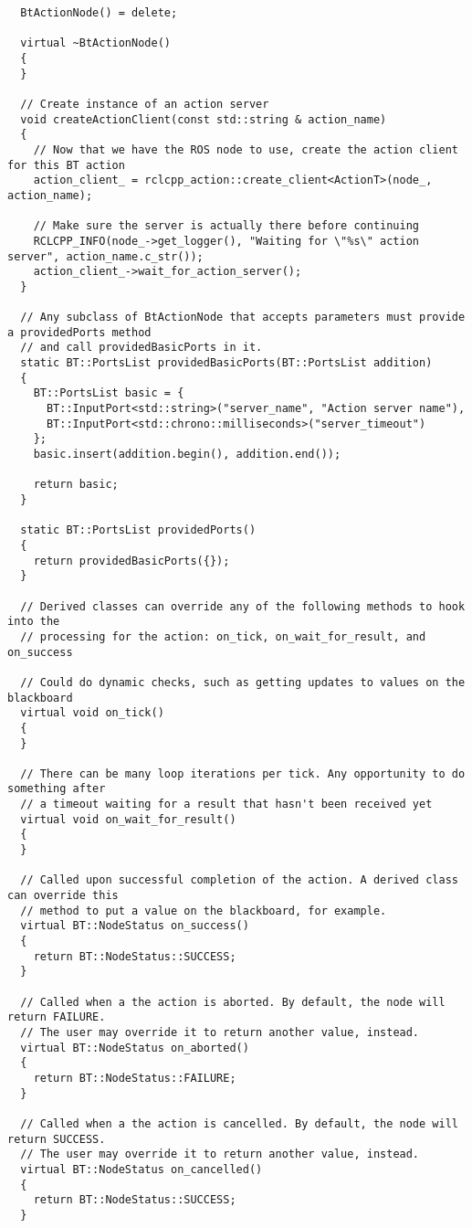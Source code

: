\begin{tcolorbox}[sharp corners, colframe=gray!80, colback=LightGray, left=0pt, top=0pt, bottom=0pt, title=\texttt{br2\_bt\_patrolling/include/br2\_bt\_patrolling/ctrl\_support/BTActionNode.hpp}]
\begin{verbatim}
  BtActionNode() = delete;

  virtual ~BtActionNode()
  {
  }

  // Create instance of an action server
  void createActionClient(const std::string & action_name)
  {
    // Now that we have the ROS node to use, create the action client for this BT action
    action_client_ = rclcpp_action::create_client<ActionT>(node_, action_name);

    // Make sure the server is actually there before continuing
    RCLCPP_INFO(node_->get_logger(), "Waiting for \"%s\" action server", action_name.c_str());
    action_client_->wait_for_action_server();
  }

  // Any subclass of BtActionNode that accepts parameters must provide a providedPorts method
  // and call providedBasicPorts in it.
  static BT::PortsList providedBasicPorts(BT::PortsList addition)
  {
    BT::PortsList basic = {
      BT::InputPort<std::string>("server_name", "Action server name"),
      BT::InputPort<std::chrono::milliseconds>("server_timeout")
    };
    basic.insert(addition.begin(), addition.end());

    return basic;
  }

  static BT::PortsList providedPorts()
  {
    return providedBasicPorts({});
  }

  // Derived classes can override any of the following methods to hook into the
  // processing for the action: on_tick, on_wait_for_result, and on_success

  // Could do dynamic checks, such as getting updates to values on the blackboard
  virtual void on_tick()
  {
  }

  // There can be many loop iterations per tick. Any opportunity to do something after
  // a timeout waiting for a result that hasn't been received yet
  virtual void on_wait_for_result()
  {
  }

  // Called upon successful completion of the action. A derived class can override this
  // method to put a value on the blackboard, for example.
  virtual BT::NodeStatus on_success()
  {
    return BT::NodeStatus::SUCCESS;
  }

  // Called when a the action is aborted. By default, the node will return FAILURE.
  // The user may override it to return another value, instead.
  virtual BT::NodeStatus on_aborted()
  {
    return BT::NodeStatus::FAILURE;
  }

  // Called when a the action is cancelled. By default, the node will return SUCCESS.
  // The user may override it to return another value, instead.
  virtual BT::NodeStatus on_cancelled()
  {
    return BT::NodeStatus::SUCCESS;
  }


\end{verbatim}
\end{tcolorbox}

